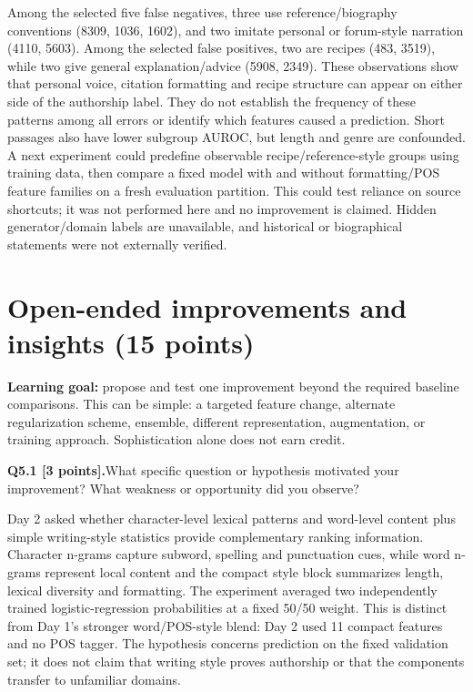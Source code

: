 \documentclass[11pt,letterpaper]{article}
\newcommand{\question}[2]{\needspace{4\baselineskip}\par\addvspace{0.45em}\noindent\textbf{#1}\quad #2\par\nobreak\vspace{0.1em}}
\begin{document}
Among the selected five false negatives, three use reference/biography conventions (8309, 1036, 1602), and two imitate personal or forum-style narration (4110, 5603). Among the selected false positives, two are recipes (483, 3519), while two give general explanation/advice (5908, 2349). These observations show that personal voice, citation formatting and recipe structure can appear on either side of the authorship label. They do not establish the frequency of these patterns among all errors or identify which features caused a prediction. Short passages also have lower subgroup AUROC, but length and genre are confounded. A next experiment could predefine observable recipe/reference-style groups using training data, then compare a fixed model with and without formatting/POS feature families on a fresh evaluation partition. This could test reliance on source shortcuts; it was not performed here and no improvement is claimed. Hidden generator/domain labels are unavailable, and historical or biographical statements were not externally verified.

\newpage
\section{Open-ended improvements and insights (15 points)}
\textbf{Learning goal:} propose and test one improvement beyond the required baseline comparisons. This can be simple: a targeted feature change, alternate regularization scheme, ensemble, different representation, augmentation, or training approach. Sophistication alone does not earn credit.

\question{Q5.1 [3 points].}{What specific question or hypothesis motivated your improvement? What weakness or opportunity did you observe?}

Day 2 asked whether character-level lexical patterns and word-level content plus simple writing-style statistics provide complementary ranking information. Character n-grams capture subword, spelling and punctuation cues, while word n-grams represent local content and the compact style block summarizes length, lexical diversity and formatting. The experiment averaged two independently trained logistic-regression probabilities at a fixed 50/50 weight. This is distinct from Day 1's stronger word/POS-style blend: Day 2 used 11 compact features and no POS tagger. The hypothesis concerns prediction on the fixed validation set; it does not claim that writing style proves authorship or that the components transfer to unfamiliar domains.
\end{document}
